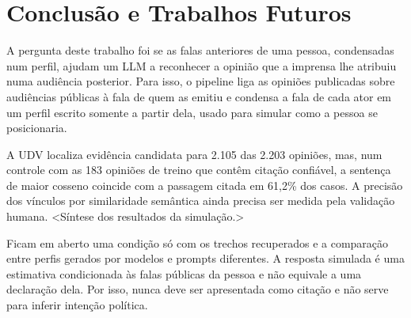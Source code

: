 \section{Conclus\~ao e Trabalhos Futuros}
\label{sec:conclusao}

A pergunta deste trabalho foi se as falas anteriores de uma pessoa, condensadas num perfil, ajudam
um LLM a reconhecer a opinião que a imprensa lhe atribuiu numa audiência posterior. Para isso, o
pipeline liga as opiniões publicadas sobre audiências públicas à fala de quem as emitiu e condensa a
fala de cada ator em um perfil escrito somente a partir dela, usado para simular como a pessoa se
posicionaria.

A UDV localiza evidência candidata para 2.105 das 2.203 opiniões, mas, num controle com as 183
opiniões de treino que contêm citação confiável, a sentença de maior cosseno coincide com a passagem
citada em 61,2\% dos casos. A precisão dos vínculos por similaridade semântica ainda precisa ser
medida pela validação humana. <Síntese dos resultados da simulação.>

Ficam em aberto uma condição só com os trechos recuperados e a comparação entre perfis gerados por
modelos e prompts diferentes. A resposta simulada é uma estimativa condicionada às falas públicas da
pessoa e não equivale a uma declaração dela. Por isso, nunca deve ser apresentada como citação e
não serve para inferir intenção política.
